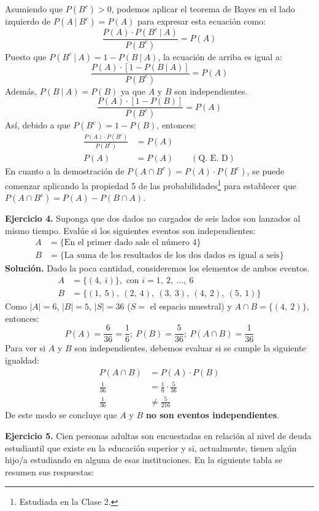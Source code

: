 \documentclass[12pt]{article}
\begin{document}
Asumiendo que $P(B^{c}) > 0$, podemos aplicar el teorema de Bayes en el lado izquierdo de $P(A \ | \ B^{c}) = P(A)$ para expresar esta ecuación como:
\[
  \frac{P(A) \cdot P(B^{c} \ | \ A)}{P(B^{c})} = P(A)
\]
Puesto que $P(B^{c} \ | \ A) = 1 - P(B \ | \ A)$, la ecuación de arriba es igual a:
\[
  \frac{P(A) \cdot [1 - P(B \ | \ A)]}{P(B^{c})} = P(A)
\]
Además, $P(B \ | \ A) = P(B)$ ya que $A$ y $B$ son independientes.
\[
  \frac{P(A) \cdot [1 - P(B)]}{P(B^{c})} = P(A)
\]
Así, debido a que $P(B^{c}) = 1 - P(B)$, entonces:
\begin{align*}
  \frac{P(A) \cdot P(B^{c})}{P(B^{c})} &= P(A) \\
  P(A) &= P(A) \qquad (\text{Q. E. D})
\end{align*}
En cuanto a la demostración de $P(A \cap B^{c}) = P(A) \cdot P(B^{c})$, se puede comenzar aplicando la propiedad 5 de las probabilidades\footnote{Estudiada en la Clase 2.} para establecer que $P(A \cap B^{c}) = P(A) - P(B \cap A)$.

\textbf{Ejercicio 4.} Suponga que dos dados no cargados de seis lados son lanzados al mismo tiempo. Evalúe si los siguientes eventos son independientes:
\begin{align*}
  A &= \{\text{En el primer dado sale el número 4}\} \\
  B &= \{\text{La suma de los resultados de los dos dados es igual a seis}\}
\end{align*}
\textbf{Solución.} Dado la poca cantidad, consideremos los elementos de ambos eventos.
\begin{align*}
  A &= \{(4, \ i)\}, \text{ con } i = 1, \ 2, \ \ldots, \ 6 \\
  B &= \{(1, \ 5), \ (2, \ 4), \ (3, \ 3), \ (4, \ 2), \ (5, \ 1)\}
\end{align*}
Como $|A| = 6$, $|B| = 5$, $|S| = 36$ ($S =$ el espacio muestral) y $A \cap B = \{(4, \ 2)\}$, entonces:
\[
  P(A) = \frac{6}{36} = \frac{1}{6}; \ P(B) = \frac{5}{36}; \ P(A \cap B) = \frac{1}{36}
\]
Para ver si $A$ y $B$ son independientes, debemos evaluar si se cumple la siguiente igualdad:
\begin{align*}
  P(A \cap B) &= P(A) \cdot P(B) \\
  \frac{1}{36} &= \frac{1}{6} \cdot \frac{5}{36} \\
  \frac{1}{36} &\neq \frac{5}{216}
\end{align*}
De este modo se concluye que $A$ y $B$ \textbf{no son eventos independientes}.

\textbf{Ejercicio 5.} Cien personas adultas son encuestadas en relación al nivel de deuda estudiantil que existe en la educación superior y si, actualmente, tienen algún hijo/a estudiando en alguna de esas instituciones. En la siguiente tabla se resumen sus respuestas:
\end{document}
